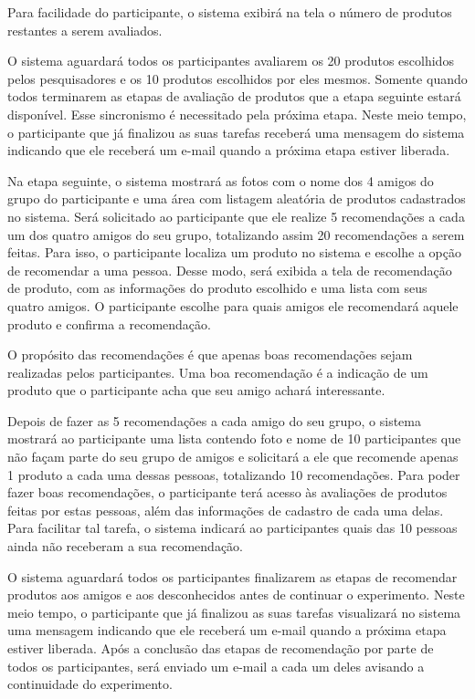 Para facilidade do participante, o sistema exibirá na tela o número de produtos restantes a serem avaliados.

 O sistema aguardará todos os participantes avaliarem os 20 produtos escolhidos pelos pesquisadores e os 10 produtos escolhidos por eles mesmos. Somente quando todos terminarem as etapas de avaliação de produtos que a etapa seguinte estará disponível. Esse sincronismo é necessitado pela próxima etapa. Neste meio tempo, o participante que já finalizou as suas tarefas receberá uma mensagem do sistema indicando que ele receberá um e-mail quando a próxima etapa estiver liberada.
 
 Na etapa seguinte, o sistema mostrará as fotos com o nome dos 4 amigos do grupo do participante e uma área com listagem aleatória de produtos cadastrados no sistema. Será solicitado ao participante que ele realize 5 recomendações a cada um dos quatro amigos do seu grupo, totalizando assim 20 recomendações a serem feitas. Para isso, o participante localiza um produto no sistema e escolhe a opção de recomendar a uma pessoa. Desse modo, será exibida a tela de recomendação de produto, com as informações do produto escolhido e uma lista com seus quatro amigos. O participante escolhe para quais amigos ele recomendará aquele produto e confirma a recomendação.
 
 O propósito das recomendações é que apenas boas recomendações sejam realizadas pelos participantes. Uma boa recomendação é a indicação de um produto que o participante acha que seu amigo achará interessante.

 Depois de fazer as 5 recomendações a cada amigo do seu grupo, o sistema mostrará ao participante uma lista contendo foto e nome de 10 participantes que não façam parte do seu grupo de amigos e solicitará a ele que recomende apenas 1 produto a cada uma dessas pessoas, totalizando 10 recomendações. Para poder fazer boas recomendações, o participante terá acesso às avaliações de produtos feitas por estas pessoas, além das informações de cadastro de cada uma delas. Para facilitar tal tarefa, o sistema indicará ao participantes quais das 10 pessoas ainda não receberam a sua recomendação.

 O sistema aguardará todos os participantes finalizarem as etapas de recomendar produtos aos amigos e aos desconhecidos antes de continuar o experimento. Neste meio tempo, o participante que já finalizou as suas tarefas visualizará no sistema uma mensagem indicando que ele receberá um e-mail quando a próxima etapa estiver liberada. Após a conclusão das etapas de recomendação por parte de todos os participantes, será enviado um e-mail a cada um deles avisando a continuidade do experimento.
 
